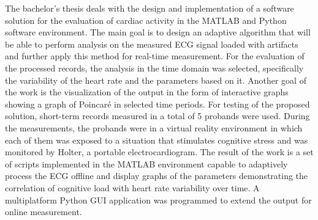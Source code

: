 The bachelor's thesis deals with the design and implementation of a software
solution for the evaluation of cardiac activity in the MATLAB and Python
software environment. The main goal is to design an adaptive algorithm that will
be able to perform analysis on the measured ECG signal loaded with artifacts and
further apply this method for real-time measurement. For the evaluation of the
processed records, the analysis in the time domain was selected, specifically
the variability of the heart rate and the parameters based on it. Another goal
of the work is the visualization of the output in the form of interactive graphs
showing a graph of Poincaré in selected time periods. For testing of the
proposed solution, short-term records measured in a total of 5 probands were
used. During the measurements, the probands were in a virtual reality
environment in which each of them was exposed to a situation that stimulates
cognitive stress and was monitored by Holter, a portable electrocardiogram. The
result of the work is a set of scripts implemented in the MATLAB environment
capable to adaptively process the ECG offline and display graphs of the
parameters demonstrating the correlation of cognitive load with heart rate
variability over time. A multiplatform Python GUI application was programmed to
extend the output for online measurement.